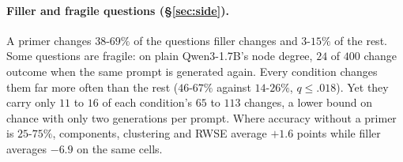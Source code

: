 \documentclass[11pt]{article}
\begin{document}
\paragraph{Filler and fragile questions (\S\ref{sec:side}).} A primer changes $38$-$69\%$ of the questions filler changes and $3$-$15\%$ of the rest. %
Some questions are fragile: on plain Qwen3-1.7B's node degree, $24$ of $400$ change outcome when the same prompt is generated again. Every condition changes them far more often than the rest ($46$-$67\%$ against $14$-$26\%$, $q\leq.018$). Yet they carry only $11$ to $16$ of each condition's $65$ to $113$ changes, a lower bound on chance with only two generations per prompt. %
Where accuracy without a primer is $25$-$75\%$, components, clustering and RWSE average $+1.6$ points while filler averages $-6.9$ on the same cells. %
\end{document}
